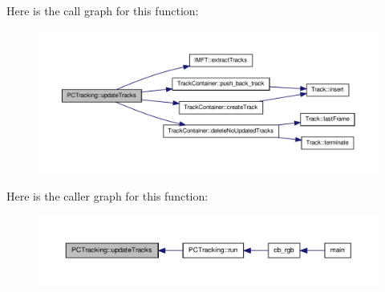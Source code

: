 \-Here is the call graph for this function\-:
\nopagebreak
\begin{figure}[H]
\begin{center}
\leavevmode
\includegraphics[width=350pt]{class_p_c_tracking_a85fd8bf718c7919cc302d4d3442f334b_cgraph}
\end{center}
\end{figure}




\-Here is the caller graph for this function\-:
\nopagebreak
\begin{figure}[H]
\begin{center}
\leavevmode
\includegraphics[width=350pt]{class_p_c_tracking_a85fd8bf718c7919cc302d4d3442f334b_icgraph}
\end{center}
\end{figure}




